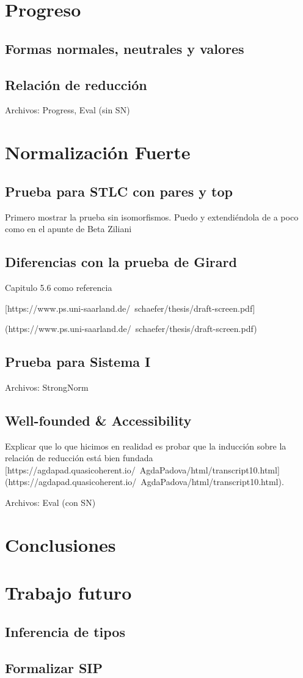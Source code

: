 \documentclass[]{report}
\begin{document}
	\section{Progreso}
	
	\subsection{Formas normales, neutrales y valores}
	\subsection{Relación de reducción}
	Archivos: Progress, Eval (sin SN)
	
	\section{Normalización Fuerte}
	
	\subsection{Prueba para STLC con pares y top}
	Primero mostrar la prueba sin isomorfismos. Puedo y extendiéndola de a poco como en el apunte de Beta Ziliani
	\subsection{Diferencias con la prueba de Girard}
	Capitulo 5.6 como referencia
	
	[https://www.ps.uni-saarland.de/~schaefer/thesis/draft-screen.pdf] 
	
	(https://www.ps.uni-saarland.de/~schaefer/thesis/draft-screen.pdf)
	\subsection{Prueba para Sistema I}
	
	Archivos: StrongNorm
	
	\subsection{Well-founded \& Accessibility}
	Explicar que lo que hicimos en realidad es probar que la inducción sobre la relación de reducción está bien fundada
	[https://agdapad.quasicoherent.io/~AgdaPadova/html/transcript10.html]
	(https://agdapad.quasicoherent.io/~AgdaPadova/html/transcript10.html).
	
	Archivos: Eval (con SN)
	
	\section{Conclusiones}
	
	
	\section{Trabajo futuro}
	\subsection{Inferencia de tipos}
	\subsection{Formalizar SIP}
	
	
	\printbibliography
	
\end{document}
